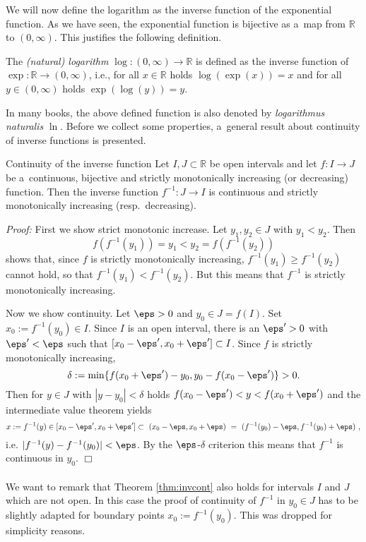 

We will now define the logarithm as the inverse function of the exponential function. As we have seen, the exponential function is bijective as a~map from $\mathbb{R}$ to $(0,\infty)$. This justifies the following definition.
\begin{Definition}{}
 The \emph{(natural) logarithm} $\log:(0,\infty)\to\mathbb{R}$ is defined as the inverse function of $\exp:\mathbb{R}\to(0,\infty)$, i.e., for all $x\in\mathbb{R}$ holds $\log(\exp(x))=x$ and for all $y \in (0,\infty)$ holds $\exp(\log(y)) = y$.
\end{Definition}
In many books, the above defined function is also denoted by {\em logarithmus naturalis} $\ln$. Before we collect some properties, a~general result about continuity of inverse functions is presented.


\begin{Theorem}{Continuity of the inverse function}\label{thm:invcont}
Let $I,J\subset\mathbb{R}$ be open intervals and let $f:I\to J$ be a~continuous, bijective and strictly monotonically increasing (or decreasing) function. 
Then the inverse function $f^{-1}:J\to I$ is continuous and strictly monotonically increasing (resp.\ decreasing).
\end{Theorem}
{\em Proof:} 
First we show strict monotonic increase. Let $y_1,y_2\in J$ with $y_1< y_2$. Then
  \[f(f^{-1}(y_1))=y_1 < y_2 = f(f^{-1}(y_2))\]
  shows that, since $f$ is strictly monotonically increasing, $f^{-1}(y_1)\geq f^{-1}(y_2)$ cannot hold, so that $f^{-1}(y_1) < f^{-1}(y_2)$.
  But this means that $f^{-1}$ is strictly monotonically increasing.

Now we show continuity. 
Let $\eps>0$ and $y_0\in J=f(I)$. Set $x_0:=f^{-1}(y_0)\in I$. Since $I$ is an open interval, there is  
an $\eps'>0$ with $\eps'<\eps$ such that $[x_0-\eps',x_0+\eps']\subset I$. 
Since $f$ is strictly monotonically increasing, $$\delta:=\min\{f(x_0+\eps')-y_0,y_0-f(x_0-\eps')\}>0.$$
Then for $y\in J$ with $|y-y_0|<\delta$ holds $f(x_0-\eps')< y< f(x_0+\eps')$ and the intermediate value theorem 
yields $$x:=f^{-1}(y) \in [x_0-\eps',x_0+\eps'] \subset ~ (x_0-\eps,x_0+\eps) ~ = ~ (f^{-1}(y_0)-\eps,f^{-1}(y_0)+\eps)\ ,$$
i.e. $|f^{-1}(y)-f^{-1}(y_0)|<\eps$. By the $\eps$-$\delta$  criterion this means that $f^{-1}$ is continuous in $y_0$. 
\hfill$\Box$
\\ \\
We want to remark that Theorem \ref{thm:invcont} also holds for intervals $I$ and $J$ which are not open. 
In this case the proof of continuity of $f^{-1}$ in $y_0\in J$ has to be slightly adapted for boundary points $x_0:=f^{-1}(y_0)$. 
This was dropped for simplicity reasons. 
  

